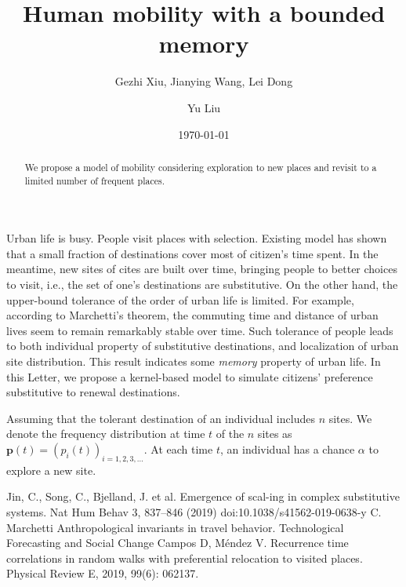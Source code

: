 \documentclass[reprint,unsortedaddress,amsmath,amssymb,floatfix,aps,prl,showkeys]{revtex4-2}
\begin{document}
\title{Human mobility with a bounded memory}
\author{Gezhi Xiu, Jianying Wang, Lei Dong}
\author{Yu Liu}
\date{\today}

\begin{abstract}
    We propose a model of mobility considering exploration to new places and revisit to a limited number of frequent places.
\end{abstract}

\maketitle

Urban life is busy. People visit places with selection. Existing model has shown that a small fraction of destinations cover most of citizen's time spent. In the meantime, new sites of cites are built over time, bringing people to better choices to visit, i.e., the set of one's destinations are substitutive\cite{ref1}. On the other hand, the upper-bound tolerance of the order of urban life is limited. For example, according to Marchetti's theorem\cite{ref2}, the commuting time and distance of urban lives seem to remain remarkably stable over time. Such tolerance of people leads to both individual property of substitutive destinations, and localization of urban site distribution. This result indicates some \emph{memory} property of urban life\cite{ref3}. In this Letter, we propose a kernel-based model to simulate citizens' preference substitutive to renewal destinations. 

Assuming that the tolerant destination of an individual includes $n$ sites. We denote the frequency distribution at time $t$ of the $n$ sites as $\textbf{p}(t) = (p_i(t))_{i = 1,2,3,\dots}$. At each time $t$, an individual has a chance $\alpha$ to explore a new site. 



% 
\begin{thebibliography}{99}  
     Jin, C., Song, C., Bjelland, J. et al. Emergence of scal-ing in complex substitutive systems. Nat Hum Behav 3, 837–846 (2019) doi:10.1038/s41562-019-0638-y
     C. Marchetti Anthropological invariants in travel behavior. Technological Forecasting and Social Change
     Campos D, Méndez V. Recurrence time correlations in random walks with preferential relocation to visited places. Physical Review E, 2019, 99(6): 062137.
\end{thebibliography}
\end{document}

